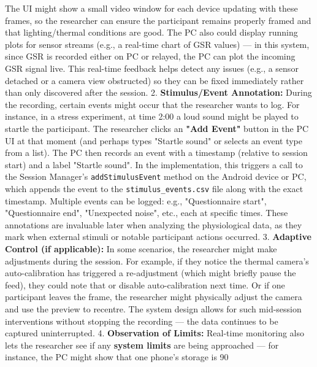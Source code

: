 The UI might show a small video window for each device updating with these frames, so the researcher can ensure the participant remains properly framed and that lighting/thermal conditions are good. The PC also could display running plots for sensor streams (e.g., a real-time chart of GSR values) --- in this system, since GSR is recorded either on PC or relayed, the PC can plot the incoming GSR signal live. This real-time feedback helps detect any issues (e.g., a sensor detached or a camera view obstructed) so they can be fixed immediately rather than only discovered after the session. 2. \textbf{Stimulus/Event Annotation:} During the recording, certain events might occur that the researcher wants to log. For instance, in a stress experiment, at time 2:00 a loud sound might be played to startle the participant. The researcher clicks an \textbf{"Add Event"} button in the PC UI at that moment (and perhaps types "Startle sound" or selects an event type from a list). The PC then records an event with a timestamp (relative to session start) and a label "Startle sound". In the implementation, this triggers a call to the Session Manager's \texttt{addStimulusEvent} method on the Android device or PC, which appends the event to the \texttt{stimulus\_events.csv} file along with the exact timestamp. Multiple events can be logged: e.g., "Questionnaire start", "Questionnaire end", "Unexpected noise", etc., each at specific times. These annotations are invaluable later when analyzing the physiological data, as they mark when external stimuli or notable participant actions occurred. 3. \textbf{Adaptive Control (if applicable):} In some scenarios, the researcher might make adjustments during the session. For example, if they notice the thermal camera's auto-calibration has triggered a re-adjustment (which might briefly pause the feed), they could note that or disable auto-calibration next time. Or if one participant leaves the frame, the researcher might physically adjust the camera and use the preview to recentre. The system design allows for such mid-session interventions without stopping the recording --- the data continues to be captured uninterrupted. 4. \textbf{Observation of Limits:} Real-time monitoring also lets the researcher see if any \textbf{system limits} are being approached --- for instance, the PC might show that one phone's storage is 90%
